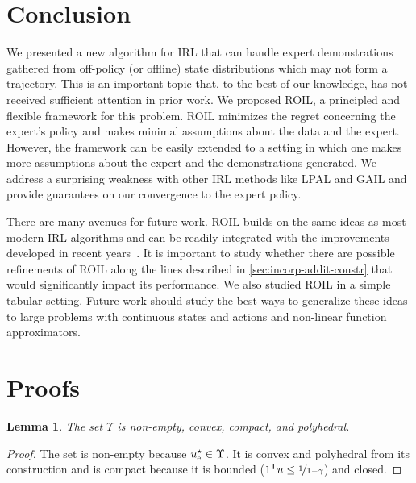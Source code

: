 \documentclass[10pt]{article}
\renewcommand{\cite}{\citep}
\theoremstyle{plain}
\newtheorem{lemma}{Lemma}
\theoremstyle{remark}
\begin{document}

\section{Conclusion}

We presented a new algorithm for IRL that can handle expert demonstrations gathered from off-policy (or offline) state distributions which may not form a trajectory. This is an important topic that, to the best of our knowledge, has not received sufficient attention in prior work. We proposed ROIL, a principled and flexible framework for this problem. ROIL minimizes the regret concerning the expert's policy and makes minimal assumptions about the data and the expert. However, the framework can be easily extended to a setting in which one makes more assumptions about the expert and the demonstrations generated. We address a surprising weakness with other IRL methods like LPAL and GAIL and provide guarantees on our convergence to the expert policy. 

There are many avenues for future work. ROIL builds on the same ideas as most modern IRL algorithms and can be readily integrated with the improvements developed in recent years~\cite{arora2021survey}. It is important to study whether there are possible refinements of ROIL along the lines described in \cref{sec:incorp-addit-constr} that would significantly impact its performance. We also studied ROIL in a simple tabular setting. Future work should study the best ways to generalize these ideas to large problems with continuous states and actions and non-linear function approximators. 
 
%


\clearpage
\appendix
\section{Proofs} %
\label{sec:appendix_proofs}
\begin{lemma}\label{prop:convexity_of_Upsilon}
The set $\Upsilon$ is non-empty, convex, compact, and polyhedral.
\end{lemma}
\begin{proof}
The set is non-empty because $u_{\mathrm{e}}^{\mathnormal{\star}}  \in \Upsilon$. It is convex and polyhedral from its construction and is compact because it is bounded ($1^{\mathsf{T}} u \le  \nicefrac{1}{1-\gamma}$) and closed.  
\end{proof}
\end{document}
